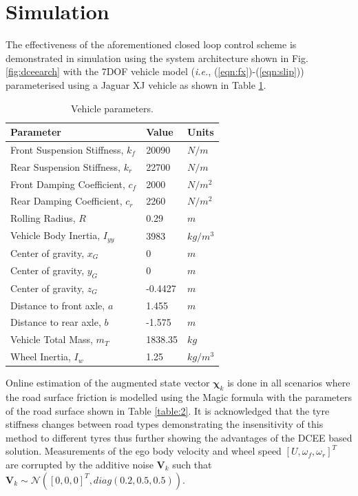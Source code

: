 \documentclass[onecolumn,journal,draftclsnofoot]{IEEEtran}
\begin{document}
\section{Simulation} \label{simulation}
The effectiveness of the aforementioned closed loop control scheme is demonstrated in simulation using the system architecture shown in Fig.  \ref{fig:dceearch} with the 7DOF vehicle model (\emph{i.e.}, (\ref{eqn:fx})-(\ref{eqn:slip})) parameterised using a Jaguar XJ vehicle as shown in Table \ref{table:1}. 
\begin{table}[h]
\caption{Vehicle parameters.}
\begin{center}
\begin{tabular}{|m{4.1cm}| m{1cm}| m{1cm} |}
    \hline
    Parameter & Value & Units\\
    \hline
    Front Suspension Stiffness, \(k_f\) & 20090 & \(N/m\) \\
    \hline
    Rear Suspension Stiffness, \(k_r\) & 22700 & \(N/m\) \\
    \hline
    Front Damping Coefficient, \(c_f\) & 2000 & \(N/m^2\) \\
    \hline
    Rear Damping Coefficient, \(c_r\) & 2260 & \(N/m^2\) \\    
    \hline
    Rolling Radius, \(R\) & 0.29 & \(m\) \\
    \hline
    Vehicle Body Inertia, \(I_{yy}\) & 3983 & \(kg/m^3\) \\
    \hline
    Center of gravity, \(x_G\) & 0 & \(m\)\\
    \hline
    Center of gravity, \(y_G\) & 0 & \(m\)\\
    \hline
    Center of gravity, \(z_G\) & -0.4427 & \(m\)\\
    \hline
    Distance to front axle, \(a\) & 1.455 & \(m\) \\
    \hline
    Distance to rear axle, \(b\) & -1.575 & \(m\) \\
    \hline
    Vehicle Total Mass, \(m_T\) & 1838.35 & \(kg\) \\
    \hline
    Wheel Inertia, \(I_w\) & 1.25 & \(kg/m^3\) \\
    \hline
\end{tabular}
\end{center}
\label{table:1}
\end{table}
Online  estimation of the augmented state vector $\mathbf{\chi}_{k}$ is done in all scenarios where the road surface friction is modelled using the Magic formula  with the parameters of the road surface shown in Table \ref{table:2}. It is acknowledged that the tyre stiffness changes between road types demonstrating the insensitivity of this method to different tyres thus further showing the advantages of the DCEE based solution. Measurements of the ego body velocity and wheel speed {$[U,\omega_f,\omega_r]^T$} are corrupted by the additive noise $\mathbf{V}_k$ such that \( \mathbf{V}_k \sim \mathcal{N}\left(\left[0,0,0\right]^T, diag\left(0.2,0.5,0.5\right)\right)\).
\end{document}
